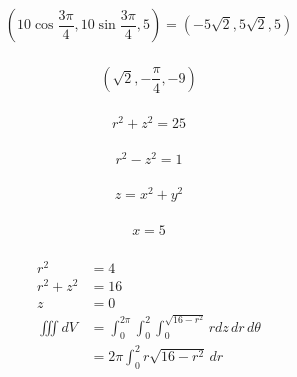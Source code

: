 \documentclass{article}
\begin{document}
\[\left( 10 \cos \frac{3 \pi}{4}, 10 \sin \frac{3 \pi}{4}, 5 \right) = \left( -5 \sqrt{2}, 5 \sqrt{2}, 5 \right)\]

\setcounter{subsubsection}{38}
\subsubsection{}

\[\left( \sqrt{2}, -\frac{\pi}{4}, -9 \right)\]

\setcounter{subsubsection}{42}
\subsubsection{}

\[r^2 + z^2 = 25\]

\setcounter{subsubsection}{44}
\subsubsection{}

\[r^2 - z^2 = 1\]

\setcounter{subsubsection}{46}
\subsubsection{}

\[z = x^2 + y^2\]

\setcounter{subsubsection}{48}
\subsubsection{}

\[x = 5\]

\setcounter{subsubsection}{50}
\subsubsection{}

\begin{align*}
  r^2       & = 4                                                                    \\
  r^2 + z^2 & = 16                                                                   \\
  z         & = 0                                                                    \\
  \iiint dV & = \int_0^{2 \pi} \int_0^2 \int_0^{\sqrt{16 - r^2}} r dz \,dr \,d\theta \\
            & = 2 \pi \int_0^2 r \sqrt{16 - r^2} \,dr
\end{align*}
\end{document}
